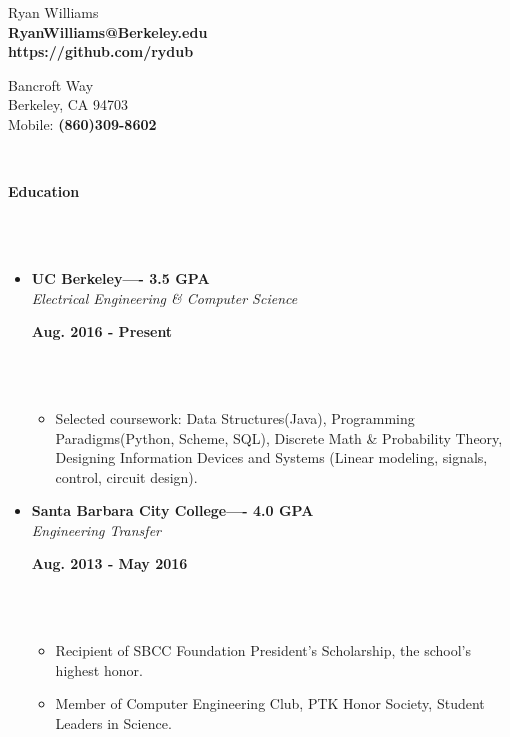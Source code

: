 \documentclass[a4paper,11pt]{article}
\newcommand{\isep}{-2 pt}
\newcommand{\lsep}{-0.2cm}
\newcommand{\resheading}[1]{{\small \colorbox{mygrey}{\begin{minipage}{0.975\textwidth}{\textbf{#1 \vphantom{p\^{E}}}}\end{minipage}}}}
\newcommand{\workexp}[4]{
\begin{minipage}[t]{7cm}
\begin{flushleft}
\textbf{#1} \\
\indent \emph{#2}\\
\end{flushleft}
\end{minipage}
\hfill
\begin{minipage}[t]{7cm}
\begin{flushright}
\textbf{#3} \\
\indent #4 \\
\end{flushright}
\end{minipage}
}
\begin{document}

\begin{minipage}[t]{7cm}
\begin{flushleft}
\large{Ryan Williams} \\
\indent\textbf{RyanWilliams@Berkeley.edu} \\
\indent\textbf{https://github.com/rydub}\\
\end{flushleft}
\end{minipage}
\hfill
\begin{minipage}[t]{7cm}
\begin{flushright}
\large {} Bancroft Way \\
\indent Berkeley, CA 94703 \\
\indent Mobile: \textbf{(860)309-8602} \\[\lsep]
\end{flushright}
\end{minipage}
\\[0.2cm]


\resheading{\textbf{Education} }\\[\lsep]
\\[-0.5cm]
\begin{itemize}
\item 
\workexp{UC Berkeley---- 3.5 GPA}{Electrical Engineering \& Computer Science}{Aug. 2016 - Present}{}
\\[-0.3cm]
	\begin{itemize}\itemsep \isep
	\item Selected coursework: Data Structures(Java), Programming Paradigms(Python, Scheme, SQL), Discrete Math \& Probability Theory, Designing Information Devices and Systems (Linear modeling, signals, control, circuit design).
	\end{itemize}
\end{itemize}
\begin{itemize}
\item 
\workexp{Santa Barbara City College---- 4.0 GPA}{Engineering Transfer}{Aug. 2013 - May 2016}{}
\\[-0.3cm]
	\begin{itemize}\itemsep \isep
	\item Recipient of SBCC Foundation President's Scholarship, the school's highest honor.
	\item Member of Computer Engineering Club, PTK Honor Society, Student Leaders in Science.
	\end{itemize}
\end{itemize}
\end{document}
